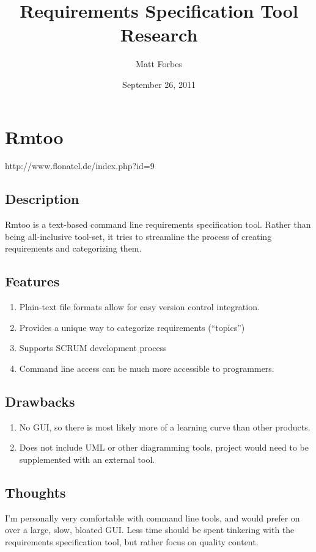 \documentclass[12pt]{article}
\title{Requirements Specification Tool Research}
\author{Matt Forbes}
\date{September 26, 2011}
\begin{document}
\maketitle						

\setcounter{tocdepth}{2}
 \tableofcontents \newpage {}

\section{Rmtoo}

http://www.flonatel.de/index.php?id=9
  
\subsection{Description}
Rmtoo is a text-based command line requirements specification
tool. Rather than being all-inclusive tool-set, it tries to streamline
the process of creating requirements and categorizing them. 

\subsection{Features}
\begin{enumerate}
\item Plain-text file formats allow for easy version control
  integration.
\item Provides a unique way to categorize requirements (``topics'')
\item Supports SCRUM development process
\item Command line access can be much more accessible to programmers.
\end{enumerate}

\subsection{Drawbacks}
\begin{enumerate}
\item No GUI, so there is most likely more of a learning curve than
  other products.
\item Does not include UML or other diagramming tools, project would
  need to be supplemented with an external tool.
\end{enumerate}

\subsection{Thoughts}
I'm personally very comfortable with command line tools, and would
prefer on over a large, slow, bloated GUI. Less time should be spent
tinkering with the requirements specification tool, but rather focus
on quality content.
\end{document}
